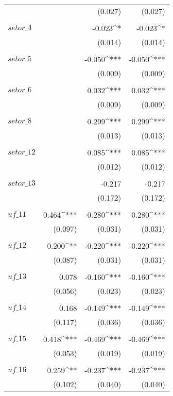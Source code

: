 \begin{apendicesenv}
\begin{longtable}{@{\extracolsep{5pt}}lD{.}{.}{-3} D{.}{.}{-3} D{.}{.}{-3} }
	  &  & (0.027) & (0.027) \\ 
	  & & & \\ 
	 $setor\_4$ &  & -0.023^{*} & -0.023^{*} \\ 
	  &  & (0.014) & (0.014) \\
	  & & & \\
	 $setor\_5$ &  & -0.050^{***} & -0.050^{***} \\
	  &  & (0.009) & (0.009) \\
	  & & & \\ 
	 $setor\_6$ &  & 0.032^{***} & 0.032^{***} \\
	  &  & (0.009) & (0.009) \\
	  & & & \\
	 $setor\_8$ &  & 0.299^{***} & 0.299^{***} \\
	  &  & (0.013) & (0.013) \\
	  & & & \\
	 $setor\_12$ &  & 0.085^{***} & 0.085^{***} \\ 
	  &  & (0.012) & (0.012) \\
	  & & & \\
	 $setor\_13$ &  & -0.217 & -0.217 \\
	  &  & (0.172) & (0.172) \\
	  & & & \\
	 $uf\_11$ & 0.464^{***} & -0.280^{***} & -0.280^{***} \\
	  & (0.097) & (0.031) & (0.031) \\
	  & & & \\
	 $uf\_12$ & 0.200^{**} & -0.220^{***} & -0.220^{***} \\
	  & (0.087) & (0.031) & (0.031) \\
	  & & & \\ 
	 $uf\_13$ & 0.078 & -0.160^{***} & -0.160^{***} \\
	  & (0.056) & (0.023) & (0.023) \\
	  & & & \\
	 $uf\_14$ & 0.168 & -0.149^{***} & -0.149^{***} \\
	  & (0.117) & (0.036) & (0.036) \\
	  & & & \\
	 $uf\_15$ & 0.418^{***} & -0.469^{***} & -0.469^{***} \\
	  & (0.053) & (0.019) & (0.019) \\
	  & & & \\ 
	 $uf\_16$ & 0.259^{**} & -0.237^{***} & -0.237^{***} \\
	  & (0.102) & (0.040) & (0.040) \\

\end{longtable}
\end{apendicesenv}
